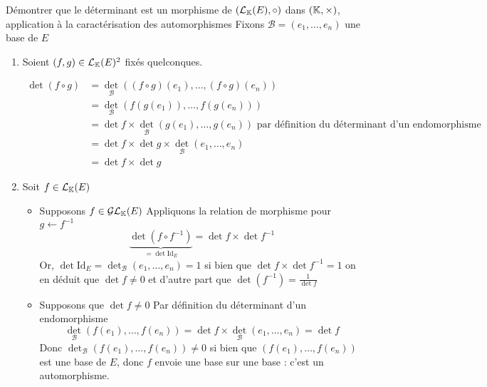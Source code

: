 \documentclass{article}
\begin{document}
\begin{question_kholle}
    [{\begin{enumerate}
        \item $\forall (f, g) \in \mathcal{L}_{\K}(E)^{2}, \det (f \circ g) = \det f \times \det g$
        
        \item $\forall f \in \mathcal{L}_{K}(E), f \in \mathcal{GL}_{\K}(E) \iff \det f \neq 0$
    \end{enumerate}
    }]{Démontrer que le déterminant est un morphisme de $(\mathcal{L}_{\mathbb K}(E), \circ)$ dans $(\mathbb K, \times)$, application à la caractérisation des automorphismes}
    Fixons $\mathcal{B}=(e_{1}, \dots, e_{n})$ une base de $E$
    \begin{enumerate} 
        \item Soient $(f, g) \in \mathcal{L}_{\mathbb K}(E)^{2}$ fixés quelconques.
        
        \begin{align*}
            \det (f \circ  g) &= \det_{\mathcal{B}}((f \circ g)(e_{1}), \dots, (f \circ  g)(e_{n})) \\
            &= \det_{\mathcal{B}}(f(g(e_{1})), \dots, f(g(e_{n}))) \\
            &= \det f \times \det_{\mathcal{B}}(g(e_{1}), \dots, g(e_{n})) \text{ par définition du déterminant d'un endomorphisme} \\
            &= \det f \times \det g \times \det_{\mathcal{B}}(e_{1}, \dots, e_{n}) \\
            &= \det f \times \det g
        \end{align*}
        
        
        
        \item Soit $f \in \mathcal{L}_{\mathbb K}(E)$
        \begin{itemize}
            \item Supposons $f \in \mathcal{GL}_{\mathbb K}(E)$
            Appliquons la relation de morphisme pour $g \leftarrow f^{-1}$
$$
            \underbrace{ \det(f \circ  f^{-1}) }_{ = \det \mathrm{Id}_{E} } = \det f \times \det f^{-1}
$$
            Or, $\det \mathrm{Id}_{E}= \det_{\mathcal{B}}(e_{1}, \dots, e_{n}) = 1$ si bien que $\det f \times \det f^{-1} = 1$ on en déduit que $\det f \neq 0$ et d'autre part que $\det (f^{-1}) = \frac{1}{\det f}$
            \item Supposons que $\det f \neq 0$
            Par définition du déterminant d'un endomorphisme
$$
            \det_{\mathcal{B}}(f(e_{1}), \dots, f(e_{n})) = \det f \times \det_{\mathcal{B}}(e_{1}, \dots, e_{n}) = \det f
$$
            Donc $\det_{\mathcal{B}}(f(e_{1}), \dots, f(e_{n})) \neq 0$ si bien que $(f(e_{1}), \dots, f(e_{n}))$ est une base de $E$, donc $f$ envoie une base sur une base : c'est un automorphisme.
        \end{itemize}
    \end{enumerate}
\end{question_kholle}
\end{document}
